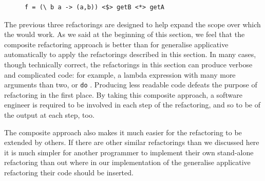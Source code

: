\DIFdelend \DIFaddbegin \begin{figure}[t]
\DIFaddendFL \begin{lstlisting}
f = (\ b a -> (a,b)) <$> getB <*> getA
\end{lstlisting}
\DIFaddbeginFL \caption{\texttt{} \texttt{}}
\label{finalF}
\end{figure}
\DIFaddend 

\DIFaddbegin {}\texttt{}\texttt{} 


\DIFaddend The previous three refactorings are designed to help expand the scope over which the \DIFdelbegin {}\DIFdelend \DIFaddbegin {}\DIFaddend would work. As we said at the beginning of this section, we feel that the composite refactoring approach is better than for generalise applicative automatically to apply the refactorings described in this section. In many cases, though technically correct, the refactorings in this section can produce \DIFdelbegin {}\DIFdelend verbose and complicated code: for example, \DIFdelbegin {}\DIFdelend a lambda expression with many more arguments than two, or \DIFdelbegin {}\DIFdelend \DIFaddbegin {}\DIFaddend \texttt{do} \DIFdelbegin {}\DIFdelend \DIFaddbegin {}\DIFaddend . Producing less readable code  defeats the purpose of refactoring in the first place. By taking this composite approach,  a software engineer is required to be \DIFdelbegin {}\DIFdelend involved in each step of the refactoring, and so to be \DIFdelbegin {}\DIFdelend \DIFaddbegin {}\DIFaddend of the output at each step, too. 

The composite approach also makes it much easier for the refactoring to be extended by others. If there are other similar refactorings than we discussed here it is much simpler for another programmer to \DIFdelbegin {}\DIFdelend implement their own stand-alone refactoring  than \DIFdelbegin {}\DIFdelend \DIFaddbegin {}\DIFaddend out where in our implementation of the generalise applicative refactoring their code should be inserted. 

